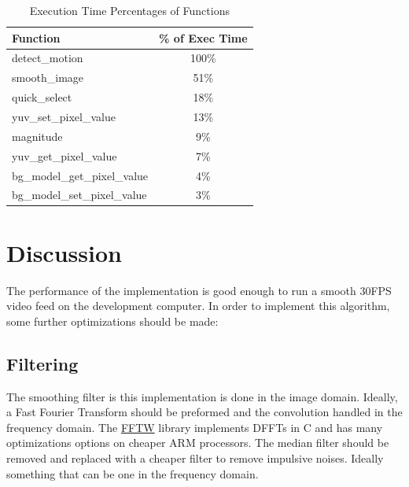 \documentclass[journal]{IEEEtran}
\begin{document}
\begin{table}[ht]
\centering
\caption{Execution Time Percentages of Functions}
\label{table:perf}
\begin{tabular}{|l|c|}
\hline
\textbf{Function}            & \textbf{\% of Exec Time} \\ \hline
detect\_motion               & 100\%                                             \\ \hline
smooth\_image                & 51\%                                              \\ \hline
quick\_select                & 18\%                                              \\ \hline
yuv\_set\_pixel\_value       & 13\%                                              \\ \hline
magnitude                    & 9\%                                               \\ \hline
yuv\_get\_pixel\_value       & 7\%                                               \\ \hline
bg\_model\_get\_pixel\_value & 4\%                                               \\ \hline
bg\_model\_set\_pixel\_value & 3\%                                               \\ \hline
\end{tabular}
\end{table}

\section{Discussion}
\label{section:discussion}
The performance of the implementation is good enough to run a smooth 30FPS video feed on the development
computer. In order to implement this algorithm, some further optimizations should be made:

\subsection{Filtering}
The smoothing filter is this implementation is done in the image domain. Ideally, a Fast Fourier Transform
should be preformed and the convolution handled in the frequency domain. The \href{http://www.fftw.org/}{FFTW}
library implements DFFTs in C and has many optimizations options on cheaper ARM processors. The median filter should be removed and replaced with a cheaper filter to remove impulsive noises. Ideally 
something that can be one in the frequency domain.
\end{document}
